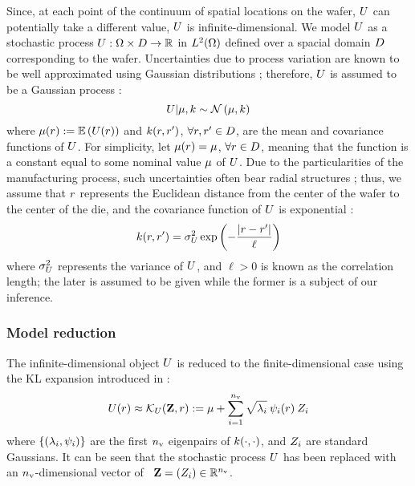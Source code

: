 Since, at each point of the continuum of spatial locations on the wafer, $U$ can potentially take a different value, $U$ is infinite-dimensional. We model $U$ as a stochastic process $U: \Omega \times D \to \mathbb{R}$ in ${L^{2}(\Omega)}$ defined over a spacial domain $D$ corresponding to the wafer. Uncertainties due to process variation are known to be well approximated using Gaussian distributions \cite{srivastava2010}; therefore, $U$ is assumed to be a Gaussian process \cite{rasmussen2006}:
\[
  \U | \fMean, \fCov \sim \gaussian{\fMean}{\fCov}
\]
where $\fMean{\r} := \E{\U(\r)}$ and $\fCov{\r, \r'}$, $\forall r, r' \in D$, are the mean and covariance functions of $U$. For simplicity, let $\fMean{\r} = \fMean$, $\forall r \in D$, meaning that the function is a constant equal to some nominal value $\fMean$ of $U$. Due to the particularities of the manufacturing process, such uncertainties often bear radial structures \cite{cheng2011}; thus, we assume that $r$ represents the Euclidean distance from the center of the wafer to the center of the die, and the covariance function of $U$ is exponential \cite{maitre2010}:
\begin{equation} \elabel{covariance-function}
  \fCov{\r, \r'} = \sigma_\U^2 \exp\left(-\frac{\abs{\r - \r'}}{\ell}\right)
\end{equation}
where $\sigma_U^2$ represents the variance of $U$, and $\ell > 0$ is known as the correlation length; the later is assumed to be given while the former is a subject of our inference.

\subsubsection{Model reduction}
The infinite-dimensional object $U$ is reduced to the finite-dimensional case using the KL expansion introduced in :
\begin{equation} \elabel{kl-approximation}
  \U(\r) \approx \klapprox{\U}{\vZ, \r} := \fMean + \sum_{i = 1}^\nvars \sqrt{\lambda_i} \: \klb_i(\r) \: \Z_i
\end{equation}
where $\{ (\lambda_i, \psi_i) \}$ are the first ${n_\text{v}}$ eigenpairs of $\fCov{\cdot, \cdot}$, and $Z_i$ are standard Gaussians. It can be seen that the stochastic process $U$ has been replaced with an ${n_\text{v}}$-dimensional vector of \rvs\ $\mathbf{Z} = (Z_i) \in \mathbb{R}^{n_\text{v}}$.


